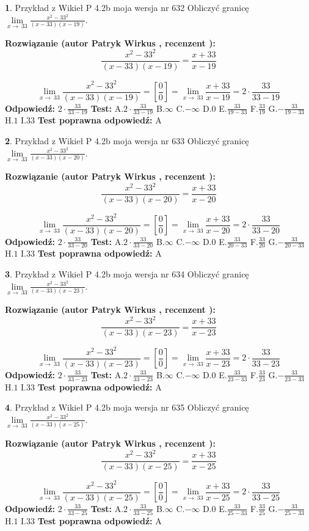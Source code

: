 \documentclass[12pt, a4paper]{article}
\theoremstyle{definition} %
\newtheorem{zad}{}
\newcommand{\zadStart}[1]{\begin{zad}#1\newline}
\newcommand{\zadStop}{\end{zad}}
\newcommand{\rozwStart}[2]{\noindent \textbf{Rozwiązanie (autor #1 , recenzent #2): }\newline}
\newcommand{\rozwStop}{\newline}
\newcommand{\odpStart}{\noindent \textbf{Odpowiedź:}\newline}
\newcommand{\odpStop}{\newline}
\newcommand{\testStart}{\noindent \textbf{Test:}\newline}
\newcommand{\testStop}{\newline}
\newcommand{\kluczStart}{\noindent \textbf{Test poprawna odpowiedź:}\newline}
\newcommand{\kluczStop}{\newline}
\begin{document}
\zadStart{Przykład z Wikieł P 4.2b moja wersja nr 632}
Obliczyć granicę $\lim\limits_{x\to\ 33}\frac{x^{2}-33^{2}}{(x-33)(x-19)}$.
\zadStop
\rozwStart{Patryk Wirkus}{}
$$\frac{x^{2}-33^{2}}{(x-33)(x-19)}=\frac{x+33}{x-19}$$

$$\lim\limits_{x\to\ 33}\frac{x^{2}-33^{2}}{(x-33)(x-19)}=[\frac{0}{0}]=\lim\limits_{x\to\ 33}\frac{x+33}{x-19}=2 \cdot \frac{33}{33-19}$$
\rozwStop
\odpStart
$2 \cdot \frac{33}{33-19}$
\odpStop
\testStart
A.$2 \cdot \frac{33}{33-19}$
B.$\infty$
C.$-\infty$
D.$0$
E.$\frac{33}{19-33}$
F.$\frac{33}{19}$
G.$-\frac{33}{19-33}$
H.$1$
I.$33$
\testStop
\kluczStart
A
\kluczStop



\zadStart{Przykład z Wikieł P 4.2b moja wersja nr 633}
Obliczyć granicę $\lim\limits_{x\to\ 33}\frac{x^{2}-33^{2}}{(x-33)(x-20)}$.
\zadStop
\rozwStart{Patryk Wirkus}{}
$$\frac{x^{2}-33^{2}}{(x-33)(x-20)}=\frac{x+33}{x-20}$$

$$\lim\limits_{x\to\ 33}\frac{x^{2}-33^{2}}{(x-33)(x-20)}=[\frac{0}{0}]=\lim\limits_{x\to\ 33}\frac{x+33}{x-20}=2 \cdot \frac{33}{33-20}$$
\rozwStop
\odpStart
$2 \cdot \frac{33}{33-20}$
\odpStop
\testStart
A.$2 \cdot \frac{33}{33-20}$
B.$\infty$
C.$-\infty$
D.$0$
E.$\frac{33}{20-33}$
F.$\frac{33}{20}$
G.$-\frac{33}{20-33}$
H.$1$
I.$33$
\testStop
\kluczStart
A
\kluczStop



\zadStart{Przykład z Wikieł P 4.2b moja wersja nr 634}
Obliczyć granicę $\lim\limits_{x\to\ 33}\frac{x^{2}-33^{2}}{(x-33)(x-23)}$.
\zadStop
\rozwStart{Patryk Wirkus}{}
$$\frac{x^{2}-33^{2}}{(x-33)(x-23)}=\frac{x+33}{x-23}$$

$$\lim\limits_{x\to\ 33}\frac{x^{2}-33^{2}}{(x-33)(x-23)}=[\frac{0}{0}]=\lim\limits_{x\to\ 33}\frac{x+33}{x-23}=2 \cdot \frac{33}{33-23}$$
\rozwStop
\odpStart
$2 \cdot \frac{33}{33-23}$
\odpStop
\testStart
A.$2 \cdot \frac{33}{33-23}$
B.$\infty$
C.$-\infty$
D.$0$
E.$\frac{33}{23-33}$
F.$\frac{33}{23}$
G.$-\frac{33}{23-33}$
H.$1$
I.$33$
\testStop
\kluczStart
A
\kluczStop



\zadStart{Przykład z Wikieł P 4.2b moja wersja nr 635}
Obliczyć granicę $\lim\limits_{x\to\ 33}\frac{x^{2}-33^{2}}{(x-33)(x-25)}$.
\zadStop
\rozwStart{Patryk Wirkus}{}
$$\frac{x^{2}-33^{2}}{(x-33)(x-25)}=\frac{x+33}{x-25}$$

$$\lim\limits_{x\to\ 33}\frac{x^{2}-33^{2}}{(x-33)(x-25)}=[\frac{0}{0}]=\lim\limits_{x\to\ 33}\frac{x+33}{x-25}=2 \cdot \frac{33}{33-25}$$
\rozwStop
\odpStart
$2 \cdot \frac{33}{33-25}$
\odpStop
\testStart
A.$2 \cdot \frac{33}{33-25}$
B.$\infty$
C.$-\infty$
D.$0$
E.$\frac{33}{25-33}$
F.$\frac{33}{25}$
G.$-\frac{33}{25-33}$
H.$1$
I.$33$
\testStop
\kluczStart
A
\kluczStop
\end{document}
